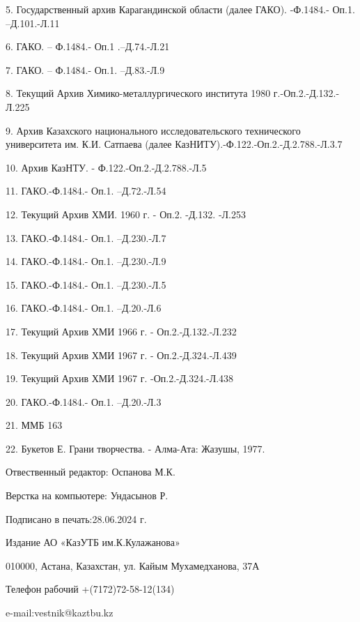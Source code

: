5. Государственный архив Карагандинской области (далее ГАКО). -Ф.1484.-
Оп.1. --Д.101.-Л.11

6. ГАКО. -- Ф.1484.- Оп.1 .--Д.74.-Л.21

7. ГАКО. -- Ф.1484.- Оп.1. --Д.83.-Л.9

8. Текущий Архив Химико-металлургического института 1980
г.-Оп.2.-Д.132.-Л.225

9. Архив Казахского национального исследовательского технического
университета им. К.И. Сатпаева (далее
КазНИТУ).-Ф.122.-Оп.2.-Д.2.788.-Л.3.7

10. Архив КазНТУ. - Ф.122.-Оп.2.-Д.2.788.-Л.5

11. ГАКО.-Ф.1484.- Оп.1. --Д.72.-Л.54

12. Текущий Архив ХМИ. 1960 г. - Оп.2. -Д.132. -Л.253

13. ГАКО.-Ф.1484.- Оп.1. --Д.230.-Л.7

14. ГАКО.-Ф.1484.- Оп.1. --Д.230.-Л.9

15. ГАКО.-Ф.1484.- Оп.1. --Д.230.-Л.5

16. ГАКО.-Ф.1484.- Оп.1. --Д.20.-Л.6

17. Текущий Архив ХМИ 1966 г. - Оп.2.-Д.132.-Л.232

18. Текущий Архив ХМИ 1967 г. - Оп.2.-Д.324.-Л.439

19. Текущий Архив ХМИ 1967 г. -Оп.2.-Д.324.-Л.438

20. ГАКО.-Ф.1484.- Оп.1. --Д.20.-Л.3

21. ММБ 163

22. Букетов Е. Грани творчества. - Алма-Ата: Жазушы, 1977.

Отвественный редактор: Оспанова М.К.

Верстка на компьютере: Ундасынов Р.

Подписано в печать:28.06.2024 г.

Издание АО «КазУТБ им.К.Кулажанова»

010000, Астана, Казахстан, ул. Кайым Мухамедханова, 37А

Телефон рабочий +(7172)72-58-12(134)

e-mail:vestnik@kaztbu.kz